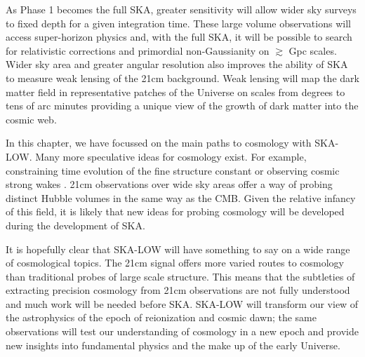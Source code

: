 \documentclass{PoS}
\begin{document}
As Phase 1 becomes the full SKA, greater sensitivity will allow wider sky surveys to fixed depth for a given integration time. These large volume observations will access super-horizon physics and, with the full SKA, it will be possible to search for relativistic corrections and primordial non-Gaussianity on $\gtrsim$ Gpc scales. Wider sky area and greater angular resolution also improves the ability of SKA to measure weak lensing of the 21cm background. Weak lensing will map the dark matter field in representative patches of the Universe on scales from degrees to tens of arc minutes providing a unique view of the growth of dark matter into the cosmic web.

In this chapter, we have focussed on the main paths to cosmology with SKA-LOW. Many more speculative ideas for cosmology exist. For example, constraining time evolution of the fine structure constant \citep{2007PhRvL..98k1301K} or observing cosmic strong wakes \citep{2010JCAP...12..028B}. 21cm observations over wide sky areas offer a way of probing distinct Hubble volumes in the same way as the CMB. Given the relative infancy of this field, it is likely that new ideas for probing cosmology will be developed during the development of SKA.

It is hopefully clear that SKA-LOW will have something to say on a wide range of cosmological topics. The 21cm signal offers more varied routes to cosmology than traditional probes of large scale structure. This means that the subtleties of extracting precision cosmology from 21cm observations are not fully understood and much work will be needed before SKA. SKA-LOW will transform our view of the astrophysics of the epoch of reionization and cosmic dawn; the same observations will test our understanding of cosmology in a new epoch and provide new insights into fundamental physics and the make up of the early Universe.





\end{document}
